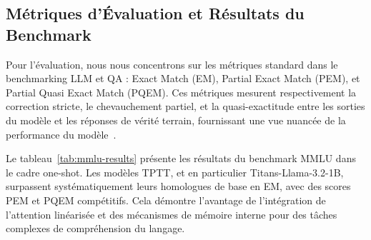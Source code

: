 \documentclass[10pt,a4paper]{article}
\begin{document}
\begin{table}[h!]
    \centering
    \caption{Métriques de performance d'entraînement pour les modèles TPTT.}
    \label{tab:training-metrics}
\end{table}

\subsection{Métriques d'Évaluation et Résultats du Benchmark}

Pour l'évaluation, nous nous concentrons sur les métriques standard dans le benchmarking LLM et QA : Exact Match (EM), Partial Exact Match (PEM), et Partial Quasi Exact Match (PQEM). Ces métriques mesurent respectivement la correction stricte, le chevauchement partiel, et la quasi-exactitude entre les sorties du modèle et les réponses de vérité terrain, fournissant une vue nuancée de la performance du modèle~\cite{hendrycks2020measuring}.

Le tableau~\ref{tab:mmlu-results} présente les résultats du benchmark MMLU dans le cadre one-shot. Les modèles TPTT, et en particulier Titans-Llama-3.2-1B, surpassent systématiquement leurs homologues de base en EM, avec des scores PEM et PQEM compétitifs. Cela démontre l'avantage de l'intégration de l'attention linéarisée et des mécanismes de mémoire interne pour des tâches complexes de compréhension du langage.
\end{document}
